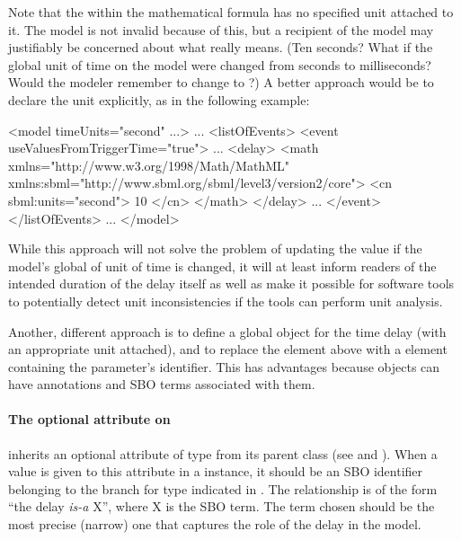 Note that the  within the mathematical formula
has no specified unit attached to it.  The model is not invalid
because of this, but a recipient of the model may justifiably be
concerned about what  really means.  (Ten seconds?  What
if the global unit of time on the model were changed from seconds
to milliseconds?  Would the modeler remember to change  to
?)  A better approach would be to declare the unit
explicitly, as in the following example:

\vspace*{1ex}
\begin{example}
<model timeUnits="second" ...>
    ...
    <listOfEvents>
        <event useValuesFromTriggerTime="true">
            ...
            <delay>
                <math xmlns="http://www.w3.org/1998/Math/MathML"
                      xmlns:sbml="http://www.sbml.org/sbml/level3/version2/core">
                    <cn sbml:units="second"> 10 </cn>
                </math>
            </delay>
            ...
        </event>
    </listOfEvents>
    ...
</model>
\end{example}
\vspace*{1ex}

While this approach will not solve the problem of updating the
value if the model's global of unit of time is changed, it will at
least inform readers of the intended duration of the delay itself
as well as make it possible for software tools to potentially
detect unit inconsistencies if the tools can perform unit
analysis.

Another, different approach is to define a global \Parameter
object for the time delay (with an appropriate unit attached), and
to replace the  element above with a  element
containing the parameter's identifier.  This has advantages
because \Parameter objects can have annotations and SBO terms
associated with them.


\paragraph{The optional  attribute on }
\label{sec:delay-sboterm}

\Delay inherits an optional  attribute of type
 from its parent class \SBase (see
 and ).  When a
value is given to this attribute in a \Delay instance, it should
be an SBO identifier belonging to the branch for type \Delay
indicated in .  The
relationship is of the form ``the delay \emph{is-a} X'', where X
is the SBO term.  The term chosen should be the most precise
(narrow) one that captures the role of the delay in the model.

